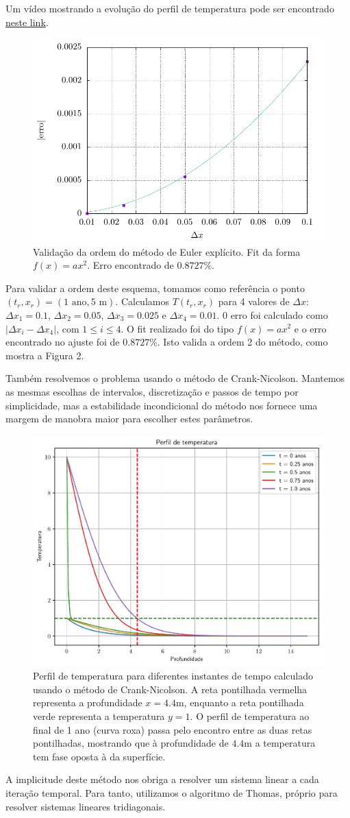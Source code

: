 \documentclass[twocolumn,showpacs,%
  nofootinbib,aps,superscriptaddress,%
  eqsecnum,prd,notitlepage,showkeys,10pt]{revtex4-1} %
\renewcommand{\leq}{\leqslant}
\begin{document}
	Um vídeo mostrando a evolução do perfil de temperatura pode ser encontrado
	\href{https://github.com/CaioTomas/Trabalho-IMCEDP/blob/main/Report/Codes/exp-euler.mp4}{neste link}.
	\begin{figure}[t]%
		\label{fig:ordem-exp-euler}
		\includegraphics[width=.45\textwidth]{Codes/ordem-exp-euler.pdf}
		\caption{Validação da ordem do método de Euler explícito. Fit da forma $f(x) = ax^2$.
		Erro encontrado de $0.8727\%$.}
	\end{figure}
	Para validar a ordem deste esquema, tomamos como referência o ponto
	$(t_r, x_r) = (1 \text{ ano}, 5 \text{ m})$. Calculamos $T(t_r, x_r)$
	para 4 valores de $\Delta x$: $\Delta x_1 = 0.1$, $\Delta x_2 = 0.05$, $\Delta x_3 = 0.025$
	e $\Delta x_4 = 0.01$. 0 erro foi calculado como $|\Delta x_i - \Delta x_4|$, com $1 \leq i \leq 4$.
	O fit realizado foi do tipo $f(x) = ax^2$ e o erro encontrado no ajuste foi de $0.8727\%$.
	Isto valida a ordem 2 do método, como mostra a Figura 2.
	
	Também resolvemos o problema usando o método de Crank-Nicolson. Mantemos as mesmas
	escolhas de intervalos, discretização e passos de tempo por simplicidade, mas a estabilidade
	incondicional do método nos fornece uma margem de manobra maior para escolher estes parâmetros.
	\begin{figure}[b]%
		\label{fig:crank-nicolson}
		\includegraphics[width=.45\textwidth]{Codes/crank-nicolson.pdf}
		\caption{Perfil de temperatura para diferentes instantes de tempo calculado usando
		o método de Crank-Nicolson. A reta pontilhada
		vermelha representa a profundidade $x = 4.4$m, enquanto a reta pontilhada verde
		representa a temperatura $y=1$. O perfil de temperatura ao final de 1 ano (curva roxa)
		passa pelo encontro entre as duas retas pontilhadas, mostrando que à profundidade
		de $4.4$m a temperatura tem fase oposta à da superfície.}
	\end{figure}
	A implicitude deste método nos obriga a resolver um sistema linear a cada iteração temporal.
	Para tanto, utilizamos o algoritmo de Thomas, próprio para resolver sistemas lineares tridiagonais.
	
\end{document}

